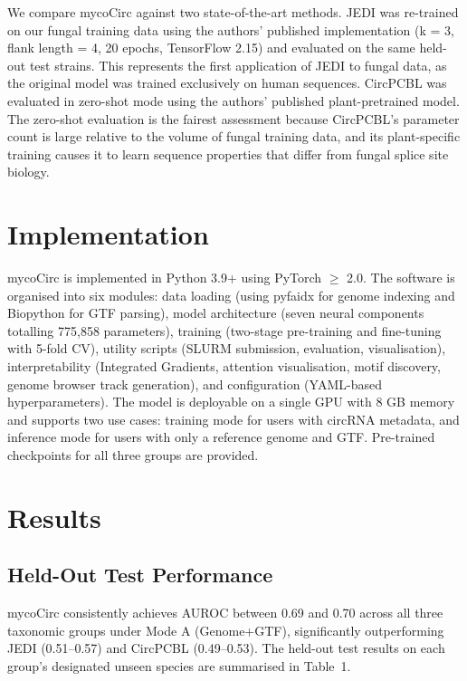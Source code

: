 \documentclass[12pt]{article}
\begin{document}
We compare mycoCirc against two state-of-the-art methods. JEDI was re-trained on our fungal training data using the authors' published implementation (k = 3, flank length = 4, 20 epochs, TensorFlow 2.15) and evaluated on the same held-out test strains. This represents the first application of JEDI to fungal data, as the original model was trained exclusively on human sequences. CircPCBL was evaluated in zero-shot mode using the authors' published plant-pretrained model. The zero-shot evaluation is the fairest assessment because CircPCBL's parameter count is large relative to the volume of fungal training data, and its plant-specific training causes it to learn sequence properties that differ from fungal splice site biology.

\section{Implementation}

mycoCirc is implemented in Python 3.9+ using PyTorch $\geq$ 2.0. The software is organised into six modules: data loading (using pyfaidx for genome indexing and Biopython for GTF parsing), model architecture (seven neural components totalling 775,858 parameters), training (two-stage pre-training and fine-tuning with 5-fold CV), utility scripts (SLURM submission, evaluation, visualisation), interpretability (Integrated Gradients, attention visualisation, motif discovery, genome browser track generation), and configuration (YAML-based hyperparameters). The model is deployable on a single GPU with 8 GB memory and supports two use cases: training mode for users with circRNA metadata, and inference mode for users with only a reference genome and GTF. Pre-trained checkpoints for all three groups are provided.

\section{Results}

\subsection{Held-Out Test Performance}

mycoCirc consistently achieves AUROC between 0.69 and 0.70 across all three taxonomic groups under Mode A (Genome+GTF), significantly outperforming JEDI (0.51--0.57) and CircPCBL (0.49--0.53). The held-out test results on each group's designated unseen species are summarised in Table~1.
\end{document}
